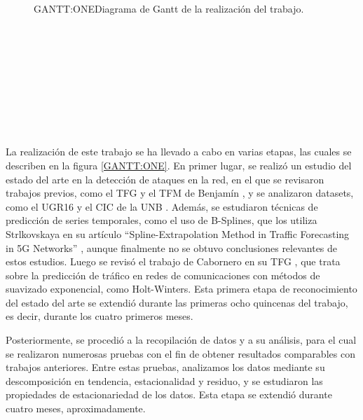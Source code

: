 \begin{figure}[Diagrama de Gantt de la realización del trabajo]{GANTT:ONE}{Diagrama de Gantt de la realización del trabajo.}
\begin{gantt}{1}{24}
     \\
     \\
     \\
     \\
     \\
     \\
     \\
     \\
\end{gantt}
\end{figure}

La realización de este trabajo se ha llevado a cabo en varias etapas, las cuales se describen en la figura \ref{GANTT:ONE}. 
En primer lugar, se realizó un estudio del estado del arte en la detección de ataques en la red, en el que se revisaron trabajos previos, como el \ac{TFG} y el \ac{TFM} de Benjamín \cite{benjamin2021, benjamin2023}, y se analizaron datasets, como el UGR16 \cite{datosugr16} y el CIC de la UNB \cite{datosunb19}. Además, se estudiaron técnicas de predicción de series temporales, como el uso de B-Splines, que los utiliza Strlkovskaya en su artículo ``Spline-Extrapolation Method in Traffic Forecasting in 5G Networks'' \cite{strelkovskaya2019}, aunque finalmente no se obtuvo conclusiones relevantes de estos estudios. Luego se revisó el trabajo de Cabornero en su \ac{TFG} \cite{cabornero2021}, que trata sobre la predicción de tráfico en redes de comunicaciones con métodos de suavizado exponencial, como Holt-Winters.
Esta primera etapa de reconocimiento del estado del arte se extendió durante las primeras ocho quincenas del trabajo, es decir, durante los cuatro primeros meses.

Posteriormente, se procedió a la recopilación de datos y a su análisis, para el cual se realizaron numerosas pruebas con el fin de obtener resultados comparables con trabajos anteriores. Entre estas pruebas, analizamos los datos mediante su descomposición en tendencia, estacionalidad y residuo, y se estudiaron las propiedades de estacionariedad de los datos. Esta etapa se extendió durante cuatro meses, aproximadamente.


